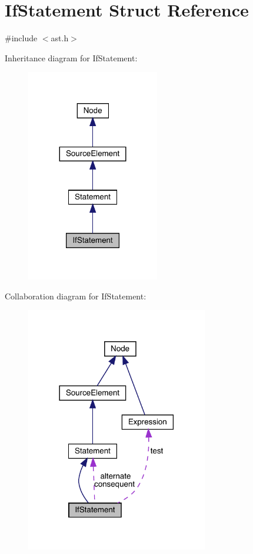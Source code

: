 \hypertarget{struct_if_statement}{}\section{If\+Statement Struct Reference}
\label{struct_if_statement}


{\ttfamily \#include $<$ast.\+h$>$}



Inheritance diagram for If\+Statement\+:\nopagebreak
\begin{figure}[H]
\begin{center}
\leavevmode
\includegraphics[width=164pt]{struct_if_statement__inherit__graph}
\end{center}
\end{figure}


Collaboration diagram for If\+Statement\+:\nopagebreak
\begin{figure}[H]
\begin{center}
\leavevmode
\includegraphics[width=225pt]{struct_if_statement__coll__graph}
\end{center}
\end{figure}
